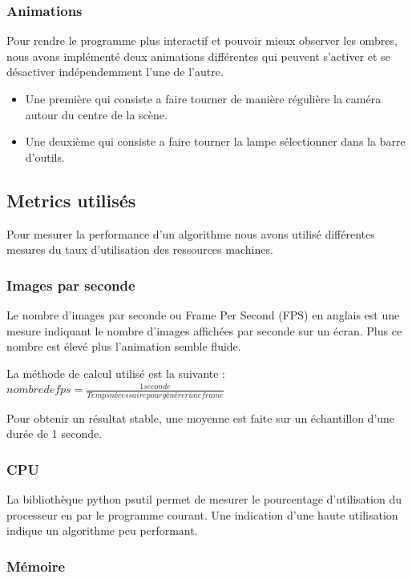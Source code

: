 \documentclass[a4paper,10pt]{report}
\begin{document}
\subsubsection{Animations}

Pour rendre le programme plus interactif et pouvoir mieux observer les ombres, nous avons implémenté deux animations différentes qui peuvent s'activer et se désactiver indépendemment l'une de l'autre.


\begin{itemize}
  \item Une première qui consiste a faire tourner de manière régulière la caméra autour du centre de la scène.
  \item Une deuxième qui consiste a faire tourner la lampe sélectionner dans la barre d'outils.
\end{itemize}

\subsection{Metrics utilisés}

Pour mesurer la performance d'un algorithme nous avons utilisé différentes mesures du taux d'utilisation des ressources machines.

\subsubsection{Images par seconde}

Le nombre d'images par seconde ou Frame Per Second (FPS) en anglais est une mesure indiquant le nombre d'images affichées par seconde sur un écran. Plus ce nombre est élevé plus l'animation semble fluide.


La méthode de calcul utilisé est la suivante : $nombre de fps = \frac{1 seconde}{Temps  nécessaire pour générer une frame}$

Pour obtenir un résultat stable, une moyenne est faite sur un échantillon d'une durée de 1 seconde.

\subsubsection{CPU}
La bibliothèque python psutil permet de mesurer le pourcentage d'utilisation du processeur en par le programme courant. Une indication d'une haute utilisation indique un algorithme peu performant.

\subsubsection{Mémoire}
\end{document}

